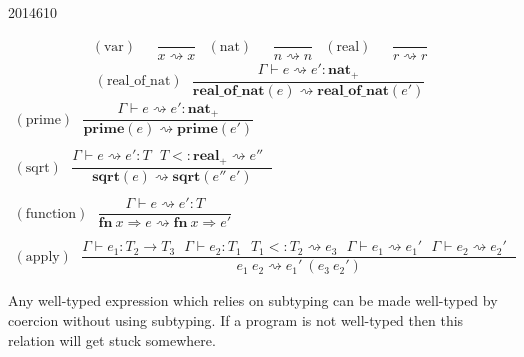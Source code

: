 \documentclass[10pt,\jkfside,a4paper]{article}
\begin{document}
\begin{examquestion}{2014}{6}{10}
\begin{enumerate}[label=(\alph*)]
\begin{enumerate}[label=(\roman*)]
\begin{align*}
(\text{var})\ \ \ & \dfrac{}{x \rightsquigarrow x} &
(\text{nat})\ \ \ & \dfrac{}{n \rightsquigarrow n} &
(\text{real})\ \ \ & \dfrac{}{r \rightsquigarrow r}
\end{align*}
\[
(\text{real\_of\_nat})\ \ \ \dfrac{
\Gamma \vdash e \rightsquigarrow e' : \mathbf{nat}_+
}{
\mathbf{real\_of\_nat}(e) \rightsquigarrow \mathbf{real\_of\_nat}(e')
}
\]
\begin{gather*}
(\text{prime})\ \ \ \dfrac{
\Gamma \vdash e \rightsquigarrow e' : \mathbf{nat}_+
}{
\mathbf{prime}(e) \rightsquigarrow \mathbf{prime}(e')
}\\\\
(\text{sqrt})\ \ \ \dfrac{
\Gamma \vdash e \rightsquigarrow e' : T \ \ \
T <: \mathbf{real}_+ \rightsquigarrow e'' \ \ \
}{
\mathbf{sqrt}(e) \rightsquigarrow \mathbf{sqrt}(e'' \ e')
}\\\\
(\text{function})\ \ \ \dfrac{
\Gamma \vdash e \rightsquigarrow e' : T
}{
\mathbf{fn} \ x \Rightarrow e \rightsquigarrow \mathbf{fn} \ x \Rightarrow e'
}\\\\
(\text{apply})\ \ \ \dfrac{
\Gamma \vdash e_1 : T_2 \to T_3 \ \ \
\Gamma \vdash e_2 : T_1 \ \ \
T_1 <: T_2 \rightsquigarrow e_3 \ \ \
\Gamma \vdash e_1 \rightsquigarrow e_1' \ \ \
\Gamma \vdash e_2 \rightsquigarrow e_2' \ \ \
}{
e_1 \ e_2 \rightsquigarrow e_1' \ (e_3 \ e_2')
}
\end{gather*}

Any well-typed expression which relies on subtyping can be made well-typed
by coercion without using subtyping. If a program is not well-typed then
this relation will get stuck somewhere.

\end{enumerate}

\end{enumerate}

\end{examquestion}
\end{document}
